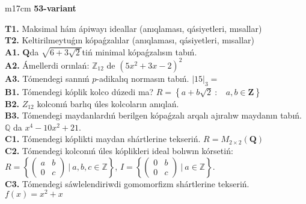 \documentclass{article}
\begin{document}
\begin{tabular}{m{17cm}}
\textbf{53-variant}
\newline

\textbf{T1.} Maksimal hám ápiwayı ideallar (anıqlaması, qásiyetleri, mısallar) \\
\textbf{T2.} Keltirilmeytuǵın kópaǵzalılar (anıqlaması, qásiyetleri, mısallar) \\
\textbf{A1.} \(\mathbf{Q}\)da \(\sqrt{6 + 3\sqrt{2}}\)tiń minimal kópaǵzalısın tabıń. \\
\textbf{A2.} Ámellerdi orınlań: \(\mathbb{Z}_{12}\) de \(\left( 5x^{2} + 3x - 2 \right)^{2}\) \\
\textbf{A3.} Tómendegi sannıń \(p\)-adikalıq normasın tabıń. \(|15|_{3} =\) \\
\textbf{B1.} Tómendegi kóplik kolco dúzedi ma? \(R = \left\{ a + b\sqrt{2}\ :\ \ \ \ a,b \in \mathbf{Z} \right\}\) \\
\textbf{B2.} \(Z_{12}\) kolconıń barlıq úles kolcoların anıqlań. \\
\textbf{B3.} Tómendegi maydanlardıń berilgen kópaǵzalı arqalı ajıralıw maydanın tabıń. \(\mathbb{Q}\) da \(x^{4} - 10x^{2} + 21\). \\
\textbf{C1.} Tómendegi kóplikti maydan shártlerine tekseriń. \(R = M_{2 \times 2}\left( \mathbf{Q} \right)\) \\
\textbf{C2.} Tómendegi kolconıń úles kóplikleri ideal bolıwın kórsetiń:
\(R = \left\{ \begin{pmatrix}
a & b \\
0 & c
\end{pmatrix}\ |\ a,b,c \in \mathbb{Z} \right\}\), \(I = \left\{ \begin{pmatrix}
0 & b \\
0 & c
\end{pmatrix}\ |\ a \in \mathbb{Z} \right\}\). \\
\textbf{C3.} Tómendegi sáwlelendiriwdi gomomorfizm shártlerine tekseriń. \(f(x) = x^{2} + x\) \\

\end{tabular}
\vspace{1cm}
\end{document}
